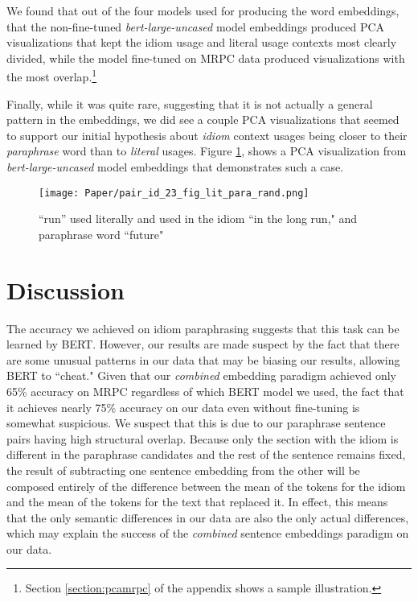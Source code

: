 \documentclass[11pt,a4paper]{article}
\begin{document}
We found that out of the four models used for producing the word embeddings, that the  non-fine-tuned \textit{bert-large-uncased} model embeddings produced PCA visualizations that kept the idiom usage and literal usage contexts most clearly divided, while the model fine-tuned on MRPC data produced visualizations with the most overlap.\footnote{Section \ref{section:pcamrpc} of the appendix shows a sample illustration.}

Finally, while it was quite rare, suggesting that it is not actually a general pattern in the embeddings, we did see a couple PCA visualizations that seemed to support our initial hypothesis about \textit{idiom} context usages being closer to their \textit{paraphrase} word than to \textit{literal} usages. Figure \ref{run}, shows a PCA visualization from \textit{bert-large-uncased} model embeddings that demonstrates such a case.

\begin{figure}[h]
\caption{``run'' used literally and used in the idiom ``in the long run," and paraphrase word ``future"}
\label{run}
\texttt{[image: Paper/pair\_id\_23\_fig\_lit\_para\_rand.png]}
\end{figure}


\section{Discussion}
The accuracy we achieved on idiom paraphrasing suggests that this task can be learned by BERT. However, our results are made suspect by the fact that there are some unusual patterns in our data that may be biasing our results, allowing BERT to ``cheat." Given that our \textit{combined} embedding paradigm achieved only 65\% accuracy on MRPC regardless of which BERT model we used, the fact that it achieves nearly 75\% accuracy on our data even without fine-tuning is somewhat suspicious. We suspect that this is due to our paraphrase sentence pairs having high structural overlap. Because only the section with the idiom is different in the paraphrase candidates and the rest of the sentence remains fixed, the result of subtracting one sentence embedding from the other will be composed entirely of the difference between the mean of the tokens for the idiom and the mean of the tokens for the text that replaced it. In effect, this means that the only semantic differences in our data are also the only actual differences, which may explain the success of the \textit{combined} sentence embeddings paradigm on our data. 
\end{document}
